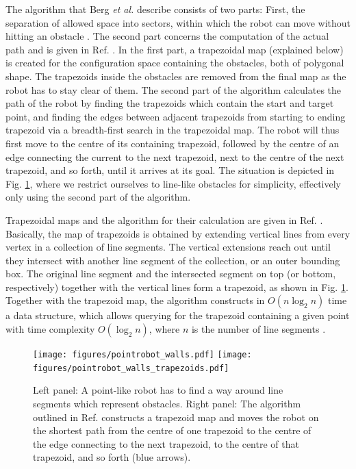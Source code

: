 The algorithm that Berg \textit{et al.} describe consists of two parts: 
First, the separation of allowed space into sectors, within which the robot can 
move without hitting an obstacle \cite[p. 286]{Berg2008}. 
The second part concerns the computation of the actual path and is given in 
Ref. \cite[p. 289]{Berg2008}. 
In the first part, a trapezoidal map (explained below) is created for the 
configuration space containing the obstacles, both of polygonal shape. 
The trapezoids inside the obstacles are removed from the final map as the robot 
has to stay clear of them. 
The second part of the algorithm calculates the path of the robot by finding 
the trapezoids which contain the start and target point, and finding the edges 
between adjacent trapezoids from starting to ending trapezoid via a breadth-first 
search in the trapezoidal map. The robot will thus first move to the centre of 
its containing trapezoid, followed by the centre of an edge connecting the current 
to the next trapezoid, next to the centre of the next trapezoid, and so forth, 
until it arrives at its goal. 
The situation is depicted in Fig. \ref{fig:robot_trapezoids}, where we restrict 
ourselves to line-like obstacles for simplicity, effectively only using the 
second part of the algorithm.

Trapezoidal maps and the algorithm for their calculation are given in Ref. 
\cite[Ch. 6, pp. 121-146]{Berg2008}. Basically, the map of trapezoids is obtained 
by extending vertical lines from every vertex in a collection of line segments. 
The vertical extensions reach out until they intersect with another line segment 
of the collection, or an outer bounding box. The original line segment and the 
intersected segment on top (or bottom, respectively) together with the vertical 
lines form a trapezoid, as shown in Fig. \ref{fig:robot_trapezoids}. 
Together with the trapezoid map, the algorithm constructs in 
$O \left(n \log_{2} n \right)$ time a data structure, which allows querying for 
the trapezoid containing a given point with time complexity $O \left( \log_{2} n \right)$, 
where $n$ is the number of line segments \cite[Theorem 6.3, p. 133]{Berg2008}.

\begin{figure}[htb]
	\centering
	\texttt{[image: figures/pointrobot\_walls.pdf]}
	\hspace{1 cm}
	\texttt{[image: figures/pointrobot\_walls\_trapezoids.pdf]}
	\caption[Path-finding using trapezoid maps.]{
		Left panel: A point-like robot has to find a way around line segments 
		which represent obstacles. 
		Right panel: The algorithm outlined in Ref. \cite[p. 289]{Berg2008} 
		constructs a trapezoid map and moves the robot on the shortest path from 
		the centre of one trapezoid to the centre of the edge connecting to the 
		next trapezoid, to the centre of that trapezoid, and so forth (blue arrows).}
	\label{fig:robot_trapezoids}
\end{figure}

